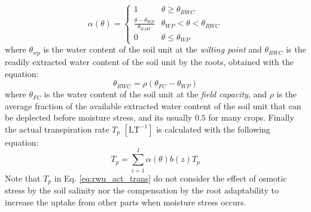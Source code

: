 \documentclass[a4paper,12pt]{article}
\begin{document}
 \begin{equation}
  \alpha(\theta)=%
  \begin{cases}
    1 & \theta\geq\theta_{RWC} \\
    \frac{\theta-\theta_{WP}}{\theta_{RAW}} & \theta_{WP}<\theta<\theta_{RWC}\\
    0 & \theta\leq\theta_{WP}
  \end{cases}
\label{eq:rwu_stress_func}
\end{equation}
where $\theta_{wp}$ is the water content of the soil unit at the \emph{wilting point} and $\theta_{RWC}$ is the readily extracted water content of the soil unit by the roots, obtained with the equation:
\begin{equation}
    \theta_{RWC}=\rho(\theta_{FC}-\theta_{WP})
    \label{eq:rwu_root_stress}
\end{equation}
where $\theta_{FC}$ is the water content of the soil unit at the \emph{field capacity}, and $\rho$ is the average fraction of the available extracted water content of the soil unit that can be deplected before moisture stress, and its usually $0.5$ for many crops.
Finally the actual transpiration rate $T_p$ $\mathrm{[LT^{-1}]}$ is calculated with the following equation:
\begin{equation}
    T_p=\sum\limits_{i=1}^{I}\alpha(\theta)b(z)T_p
    \label{eq:rwu_act_trans}
\end{equation}
Note that $T_p$ in Eq. \ref{eq:rwu_act_trans} do not consider the effect of osmotic stress by the soil salinity nor the compensation by the root adaptability to increase the uptake from other parts when moisture stress occurs. 



\end{document}
